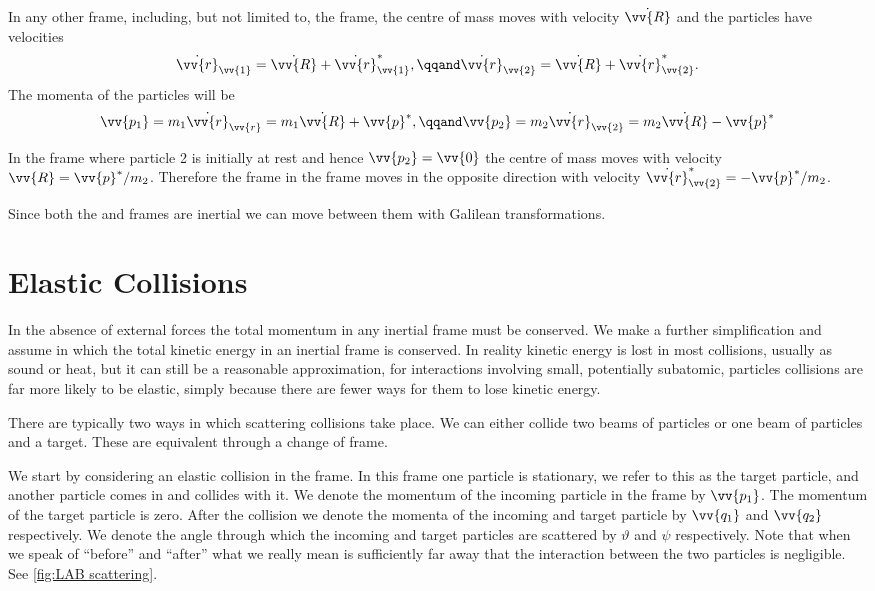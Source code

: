     In any other frame, including, but not limited to, the \LAB{} frame, the centre of mass moves with velocity \(\dot{\vv{R}}\) and the particles have velocities
    \begin{equation}
        \dot{\vv{r}}_{\vv{1}} = \dot{\vv{R}} + \dot{\vv{r}}_{\vv{1}}^*, \qqand \dot{\vv{r}}_{\vv{2}} = \dot{\vv{R}} + \dot{\vv{r}}_{\vv{2}}^*.
    \end{equation}
    The momenta of the particles will be
    \begin{equation}
        \vv{p_1} = m_1\dot{\vv{r}}_{\vv{r}} = m_1\dot{\vv{R}} + \vv{p}^*, \qqand \vv{p_2} = m_2\dot{\vv{r}}_{\vv{2}} = m_2\dot{\vv{R}} - \vv{p}^*
    \end{equation}
    
    In the \LAB{} frame where particle 2 is initially at rest and hence \(\vv{p_2} = \vv{0}\) the centre of mass moves with velocity \(\vv{R} = \vv{p}^*/m_2\).
    Therefore the \LAB{} frame in the \CM{} frame moves in the opposite direction with velocity \(\dot{\vv{r}}_{\vv{2}}^* = -\vv{p}^*/m_2\).
    
    Since both the \LAB{} and \CM{} frames are inertial we can move between them with Galilean transformations.
    
    \section{Elastic Collisions}
    In the absence of external forces the total momentum in any inertial frame must be conserved.
    We make a further simplification and assume  in which the total kinetic energy in an inertial frame is conserved.
    In reality kinetic energy is lost in most collisions, usually as sound or heat, but it can still be a reasonable approximation, for interactions involving small, potentially subatomic, particles collisions are far more likely to be elastic, simply because there are fewer ways for them to lose kinetic energy.
    
    There are typically two ways in which scattering collisions take place.
    We can either collide two beams of particles or one beam of particles and a target.
    These are equivalent through a change of frame.
    
    We start by considering an elastic collision in the \LAB{} frame.
    In this frame one particle is stationary, we refer to this as the target particle, and another particle comes in and collides with it.
    We denote the momentum of the incoming particle in the \LAB{} frame by \(\vv{p_1}\).
    The momentum of the target particle is zero.
    After the collision we denote the momenta of the incoming and target particle by \(\vv{q_1}\) and \(\vv{q_2}\) respectively.
    We denote the angle through which the incoming and target particles are scattered by \(\vartheta\) and \(\psi\) respectively.
    Note that when we speak of \enquote{before} and \enquote{after} what we really mean is sufficiently far away that the interaction between the two particles is negligible.
    See \cref{fig:LAB scattering}.
    
